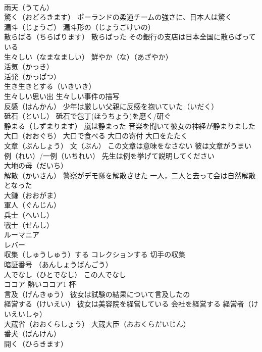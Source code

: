 \documentclass[8pt]{extreport}
\begin{document}
\begin{CJK}{UTF8}{min}
\\	雨天（うてん）
\\	驚く（おどろきます） ポーランドの柔道チームの強さに、日本人は驚く
\\	漏斗（じょうご） 漏斗形の（じょうごけいの）
\\	散らばる（ちらばります） 散らばった その銀行の支店は日本全国に散らばっている
\\	生々しい（なまなましい） 鮮やか（な）（あざやか）
\\	活気（かっき）
\\	活発（かっぱつ）
\\	生き生きとする（いきいき）
\\	生々しい思い出 生々しい事件の描写
\\	反感（はんかん） 少年は厳しい父親に反感を抱いていた（いだく）
\\	砥石（といし） 砥石で包丁(ほうちょう)を磨く/研ぐ
\\	静まる（しずまります） 嵐は静まった 音楽を聞いて彼女の神経が静まりました
\\	大口（おおぐち） 大口で食べる 大口の寄付 大口をたたく
\\	文章（ぶんしょう） 文（ぶん） この文章は意味をなさない 彼は文章がうまい
\\	例（れい）/一例（いちれい） 先生は例を挙げて説明してください
\\	大地の母（だいち）
\\	解散（かいさん） 警察がデモ隊を解散させた 一人，二人と去って会は自然解散となった
\\	大鎌（おおがま）
\\	軍人（ぐんじん）　
\\	兵士（へいし）　
\\	戦士（せんし）　
\\	ルーマニア
\\	レバー 
\\	収集（しゅうしゅう）する コレクションする 切手の収集
\\	暗証番号 （あんしょうばんごう）
\\	人でなし（ひとでなし） この人でなし
\\	ココア 熱いココア1 杯
\\	言及（げんきゅう） 彼女は試験の結果について言及したの
\\	経営する（けいえい） 彼女は美容院を経営している 会社を経営する 経営者（けいえいしゃ）
\\	大蔵省（おおくらしょう） 大蔵大臣（おおくらだいじん）
\\	番犬（ばんけん）
\\	開く（ひらきます）

\end{CJK}
\end{document}
